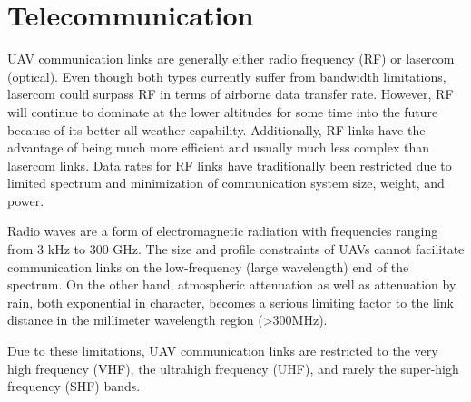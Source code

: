 \chapter{Telecommunication}\label{ch:tele}

UAV communication links are generally either radio frequency (RF) or lasercom (optical). Even though both types currently suffer from bandwidth limitations, lasercom could surpass RF in terms of airborne data transfer rate. However, RF will continue to dominate at the lower altitudes for some time into the future because of its better all-weather capability. Additionally, RF links have the advantage of being much more efficient and usually much less complex than lasercom links.
Data rates for RF links have traditionally been restricted due to limited spectrum and
minimization of communication system size, weight, and power.

Radio waves are a form of electromagnetic radiation with frequencies ranging from 3 kHz to 300 GHz. The size and profile constraints of UAVs cannot facilitate communication links on the low-frequency (large wavelength) end of the spectrum. 
On the other hand, atmospheric attenuation as well as attenuation by rain, both
exponential in character, becomes a serious limiting factor to the link distance in
the millimeter wavelength region (>300MHz). 
	
Due to these limitations, UAV communication links are restricted to the very high frequency (VHF), the ultrahigh frequency (UHF), and rarely the super-high frequency (SHF) bands.


